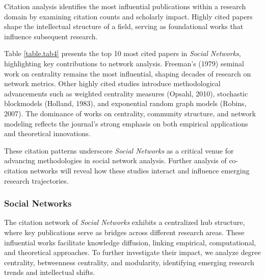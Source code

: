 \documentclass[twocolumn]{article}
\begin{document}
Citation analysis identifies the most influential publications within a research domain by examining citation counts and scholarly impact. Highly cited papers shape the intellectual structure of a field, serving as foundational works that influence subsequent research. 

Table \ref{table.tab4} presents the top 10 most cited papers in \textit{Social Networks}, highlighting key contributions to network analysis. Freeman’s (1979) seminal work on centrality remains the most influential, shaping decades of research on network metrics. Other highly cited studies introduce methodological advancements such as weighted centrality measures (Opsahl, 2010), stochastic blockmodels (Holland, 1983), and exponential random graph models (Robins, 2007). The dominance of works on centrality, community structure, and network modeling reflects the journal’s strong emphasis on both empirical applications and theoretical innovations.

These citation patterns underscore \textit{Social Networks} as a critical venue for advancing methodologies in social network analysis. Further analysis of co-citation networks will reveal how these studies interact and influence emerging research trajectories.

	\subsubsection*{Social Networks}
	
	The citation network of \textit{Social Networks} exhibits a centralized hub structure, where key publications serve as bridges across different research areas. These influential works facilitate knowledge diffusion, linking empirical, computational, and theoretical approaches. To further investigate their impact, we analyze degree centrality, betweenness centrality, and modularity, identifying emerging research trends and intellectual shifts.
	
\end{document}
